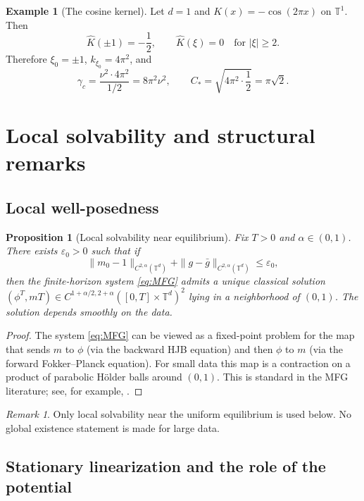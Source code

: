 \documentclass[11pt]{amsart}
\newtheorem{proposition}[theorem]{Proposition}
\theoremstyle{definition}
\newtheorem{example}[theorem]{Example}
\theoremstyle{remark}
\newtheorem{remark}[theorem]{Remark}
\newcommand{\Td}{\mathbb{T}^d}
\newcommand{\To}{\mathbb{T}^1}
\newcommand{\Kh}{\widehat{K}}
\newcommand{\phiT}{\phi^T}
\newcommand{\gamc}{\gamma_c}
\newcommand{\eps}{\varepsilon}
\begin{document}
\begin{example}[The cosine kernel]
\label{ex:cosine}
Let $d=1$ and $K(x)=-\cos(2\pi x)$ on $\To$. Then
\[
\Kh(\pm 1)=-\frac12,\qquad \Kh(\xi)=0\quad\text{for }|\xi|\ge 2.
\]
Therefore $\xi_0=\pm 1$, $k_{\xi_0}=4\pi^2$, and
\[
\gamc = \frac{\nu^2\cdot 4\pi^2}{1/2} = 8\pi^2\nu^2,
\qquad
C_\ast = \sqrt{4\pi^2\cdot \frac12}=\pi\sqrt{2}.
\]
\end{example}

\section{Local solvability and structural remarks}
\label{sec:wellposed}

\subsection{Local well-posedness}
\label{sub:local-wp}

\begin{proposition}[Local solvability near equilibrium]
\label{prop:local-wellposed}
Fix $T>0$ and $\alpha\in(0,1)$. There exists $\eps_0>0$ such that if
\[
\|m_0-1\|_{C^{2,\alpha}(\Td)}+\|g-\bar g\|_{C^{2,\alpha}(\Td)}\le \eps_0,
\]
then the finite-horizon system \eqref{eq:MFG} admits a unique classical solution
$(\phiT,mT)\in C^{1+\alpha/2,2+\alpha}([0,T]\times \Td)^2$ lying in a neighborhood of $(0,1)$. The solution depends smoothly on the data.
\end{proposition}

\begin{proof}
The system \eqref{eq:MFG} can be viewed as a fixed-point problem for the map that sends $m$ to $\phi$ (via the backward HJB equation) and then $\phi$ to $m$ (via the forward Fokker--Planck equation). For small data this map is a contraction on a product of parabolic H\"older balls around $(0,1)$. This is standard in the MFG literature; see, for example, \cite{CaP19}.
\end{proof}

\begin{remark}
Only local solvability near the uniform equilibrium is used below. No global existence statement is made for large data.
\end{remark}

\subsection{Stationary linearization and the role of the potential}
\label{sub:stationary-linearization}
\end{document}
